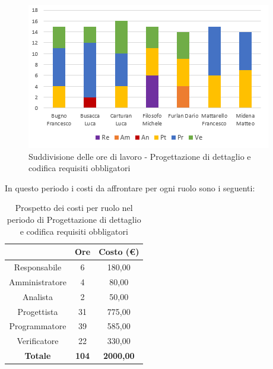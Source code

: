    \begin{figure}[H]
       \centering
        \includegraphics[scale=1.2]{immagini/ore_lavoro_reqObbligatori.png}
        \caption{Suddivisione delle ore di lavoro - Progettazione di dettaglio e codifica requisiti obbligatori}
      \end{figure}
   
\pagebreak
   In questo periodo i costi da affrontare per ogni ruolo sono i seguenti:
   
   \begin{table}[H]
       \centering
       \renewcommand{\arraystretch}{1.8}
       \begin{tabular}{c|c|c}
         \rowcolor[HTML]{125E28} 
         \multicolumn{1}{c}{\color[HTML]{FFFFFF}\textbf{Ruolo}}
         & \multicolumn{1}{c}{\color[HTML]{FFFFFF}\textbf{Ore}}
         & \multicolumn{1}{c}{\color[HTML]{FFFFFF}\textbf{Costo (€)}}\\
         \hline
         Responsabile   & 6 & 180,00\\
         Amministratore & 4 & 80,00\\
         Analista       & 2 & 50,00\\
         Progettista    & 31 & 775,00\\
         Programmatore  & 39 & 585,00\\
         Verificatore   & 22 & 330,00\\
         \textbf{Totale} & \textbf{104} & \textbf{2000,00}
       \end{tabular}
       \caption{Prospetto dei costi per ruolo nel periodo di Progettazione di dettaglio e codifica requisiti obbligatori}
     \end{table}
   
